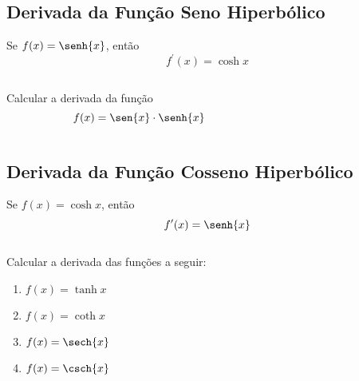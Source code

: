 \subsection{Derivada da Função Seno Hiperbólico}
\begin{frame}
  \begin{theorem}
    Se $f(x)=\senh{x}$, então
    \begin{equation*}
      f^{\prime}(x) = \cosh{x}
    \end{equation*}
  \end{theorem}
  \begin{columns}[onlytextwidth]
    \begin{column}{0.49\textwidth}
      \begin{example-highlight}
        Calcular a derivada da função
        \begin{equation*}
          f(x)=\sen{x}\cdot\senh{x}
        \end{equation*}
      \end{example-highlight}
    \end{column}
    \begin{column}{0.49\textwidth}
    \end{column}
  \end{columns}
\end{frame}

\subsection{Derivada da Função Cosseno Hiperbólico}
\begin{frame}
  \begin{theorem}
    Se $f(x)=\cosh{x}$, então
    \begin{equation*}
      f^{\prime}(x) = \senh{x}
    \end{equation*}
  \end{theorem}
  \begin{columns}[onlytextwidth]
    \begin{column}{0.49\textwidth}
      \begin{example-highlight}
        Calcular a derivada das funções a seguir:
        \begin{enumerate}
          \item $f(x) = \tanh{x}$
          \item $f(x) = \coth{x}$
          \item $f(x) = \sech{x}$
          \item $f(x) = \csch{x}$
        \end{enumerate}
      \end{example-highlight}
    \end{column}
    \begin{column}{0.49\textwidth}
    \end{column}
  \end{columns}
\end{frame}

